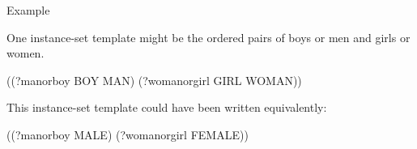 \documentclass[letterpaper,10pt,english]{sphinxmanual}
\begin{document}

\begin{sphinxVerbatim}[commandchars=\\\{\}]
  

  

  

  
\end{sphinxVerbatim}

Example

One instance-set template might be the ordered pairs of boys or men and
girls or women.

\begin{sphinxVerbatim}[commandchars=\\\{\}]
((?man\PYGZhy{}or\PYGZhy{}boy BOY MAN) (?woman\PYGZhy{}or\PYGZhy{}girl GIRL WOMAN))
\end{sphinxVerbatim}

This instance-set template could have been written equivalently:

\begin{sphinxVerbatim}[commandchars=\\\{\}]
((?man\PYGZhy{}or\PYGZhy{}boy MALE) (?woman\PYGZhy{}or\PYGZhy{}girl FEMALE))
\end{sphinxVerbatim}
\end{document}
